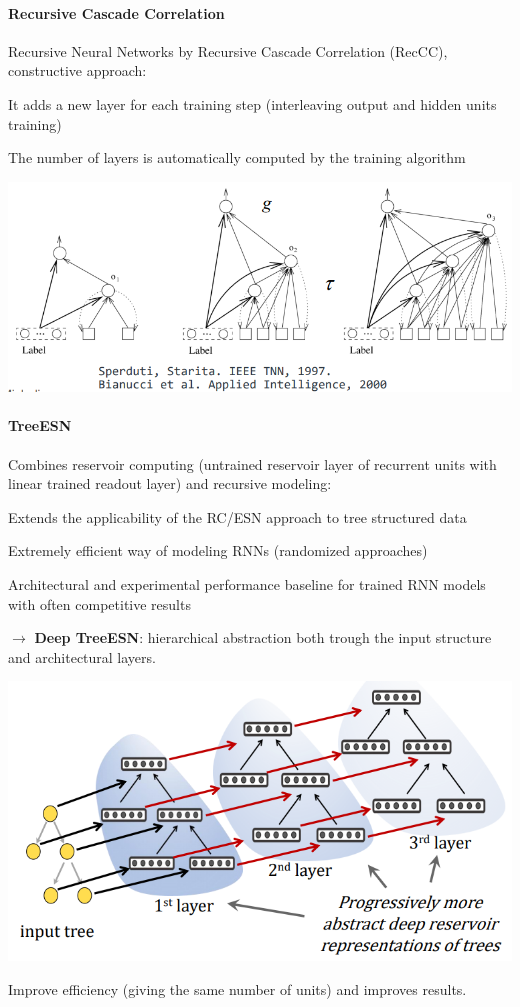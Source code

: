 \documentclass[10pt]{report}
\begin{document}
\paragraph{Recursive Cascade Correlation} Recursive Neural Networks by Recursive Cascade Correlation (RecCC), constructive approach:
\begin{list}{}{}
	\item It adds a new layer for each training step (interleaving output and hidden units training)
	\item The number of layers is automatically computed by the training algorithm
\end{list}
\begin{center}
	\includegraphics[scale=0.5]{44.png}
\end{center}
\paragraph{TreeESN} Combines reservoir computing (untrained reservoir layer of recurrent units with linear trained readout layer) and recursive modeling:
\begin{list}{}{}
	\item Extends the applicability of the RC/ESN approach to tree structured data
	\item Extremely efficient way of modeling RNNs (randomized approaches)
	\item Architectural and experimental performance baseline for trained RNN models with often competitive results
\end{list}
$\rightarrow$ \textbf{Deep TreeESN}: hierarchical abstraction both trough the input structure and architectural layers.
\begin{center}
	\includegraphics[scale=0.5]{45.png}
\end{center}
Improve efficiency (giving the same number of units) and improves results.
\end{document}
